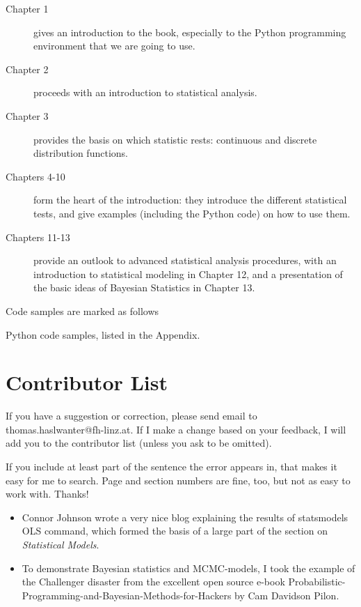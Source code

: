 \begin{description}
  \item[Chapter 1] gives an introduction to the book, especially to the Python programming environment that we are going to use.
  \item[Chapter 2] proceeds with an introduction to statistical analysis.
  \item[Chapter 3] provides the basis on which statistic rests: continuous and discrete distribution functions.
  \item[Chapters 4-10] form the heart of the introduction: they introduce the different statistical tests, and give examples (including the Python code) on how to use them.
  \item[Chapters 11-13] provide an outlook to advanced statistical analysis procedures, with an introduction to statistical modeling in Chapter 12, and a presentation of the basic ideas of Bayesian Statistics in Chapter 13.
\end{description}

Code samples are marked as follows

     Python code samples, listed in the Appendix.

\section*{Contributor List}

If you have a suggestion or correction, please send email to
thomas.haslwanter@fh-linz.at. If I make a change based on your feedback,
I will add you to the contributor list (unless you ask to be omitted).

If you include at least part of the sentence the error appears in, that
makes it easy for me to search. Page and section numbers are fine, too,
but not as easy to work with. Thanks!

\begin{itemize}
  \item Connor Johnson wrote a very nice blog explaining the results of
  statsmodels OLS command, which formed the basis of a large part of the
  section on \emph{Statistical Models}.

  \item To demonstrate Bayesian statistics and MCMC-models, I took the example of the Challenger disaster from the excellent open source e-book Probabilistic-Programming-and-Bayesian-Methods-for-Hackers by Cam Davidson Pilon.
\end{itemize}
